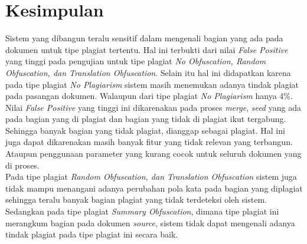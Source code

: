 \documentclass[../Book.tex]{subfiles}
\begin{document}
\section{Kesimpulan}

Sistem yang dibangun teralu sensitif dalam mengenali bagian yang ada pada dokumen untuk tipe plagiat tertentu. Hal ini terbukti dari nilai \textit{False Positive} yang tinggi pada pengujian untuk tipe plagiat \textit{No Obfuscation, Random Obfuscation, dan Translation Obfuscation}. Selain itu hal ini didapatkan karena pada tipe plagiat \textit{No Plagiarism} sistem masih menemukan adanya tindak plagiat pada pasangan dokumen. Walaupun dari tipe plagiat \textit{No Plagiarism} hanya 4\%. \\

\noindent Nilai \textit{False Positive} yang tinggi ini dikarenakan pada proses \textit{merge}, \textit{seed} yang ada pada bagian yang di plagiat dan bagian yang tidak di plagiat ikut tergabung. Sehingga banyak bagian yang tidak plagiat, dianggap sebagai plagiat. Hal ini juga dapat dikarenakan masih banyak fitur yang tidak relevan yang terbangun. Ataupun penggunaan parameter yang kurang cocok untuk seluruh dokumen yang di proses. \\

\noindent Pada tipe plagiat \textit{Random Obfuscation, dan Translation Obfuscation} sistem juga tidak mampu menangani adanya perubahan pola kata pada bagian yang diplagiat sehingga teralu banyak bagian plagiat yang tidak terdeteksi oleh sistem. \\ 

\noindent Sedangkan pada tipe plagiat \textit{Summary Obfuscation}, dimana tipe plagiat ini merangkum bagian pada dokumen \textit{source}, sistem tidak dapat mengenali adanya tindak plagiat pada tipe plagiat ini secara baik. 
\end{document}
